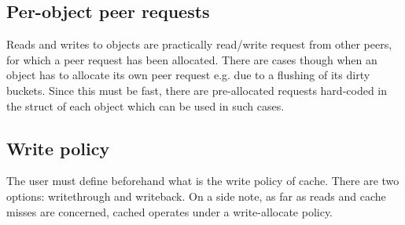 \subsection{Per-object peer requests}

Reads and writes to objects are practically read/write request from other
peers, for which a peer request has been allocated. There are cases though
when an object has to allocate its own peer request e.g. due to a flushing of
its dirty buckets. Since this must be fast, there are pre-allocated requests
hard-coded in the struct of each object which can be used in such cases.

\subsection{Write policy}

The user must define beforehand what is the write policy of cache. There are
two options: writethrough and writeback. On a side note, as far as reads and
cache misses are concerned, cached operates under a write-allocate policy.

